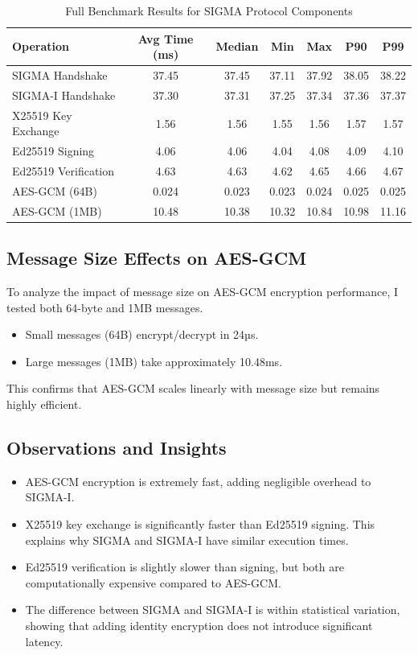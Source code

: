 \documentclass[twoside,a4paper,12pt]{article}
\begin{document}
\begin{table}[h]
    \centering
    \caption{Full Benchmark Results for SIGMA Protocol Components}
    \label{tab:full_benchmark_results}
    \renewcommand{\arraystretch}{1.2} %
    \begin{tabular}{|l|c|c|c|c|c|c|}
        \hline
        \textbf{Operation} & \textbf{Avg Time (ms)} & \textbf{Median} & \textbf{Min} & \textbf{Max} & \textbf{P90} & \textbf{P99} \\
        \hline
        SIGMA Handshake & 37.45 & 37.45 & 37.11 & 37.92 & 38.05 & 38.22 \\
        SIGMA-I Handshake & 37.30 & 37.31 & 37.25 & 37.34 & 37.36 & 37.37 \\
        X25519 Key Exchange & 1.56 & 1.56 & 1.55 & 1.56 & 1.57 & 1.57 \\
        Ed25519 Signing & 4.06 & 4.06 & 4.04 & 4.08 & 4.09 & 4.10 \\
        Ed25519 Verification & 4.63 & 4.63 & 4.62 & 4.65 & 4.66 & 4.67 \\
        AES-GCM (64B) & 0.024 & 0.023 & 0.023 & 0.024 & 0.025 & 0.025 \\
        AES-GCM (1MB) & 10.48 & 10.38 & 10.32 & 10.84 & 10.98 & 11.16 \\
        \hline
    \end{tabular}
\end{table}
\subsection{Message Size Effects on AES-GCM}
To analyze the impact of message size on AES-GCM encryption performance, I tested both 64-byte and 1MB messages. 

\begin{itemize}
    \item Small messages (64B) encrypt/decrypt in 24µs.
    \item Large messages (1MB) take approximately 10.48ms.
\end{itemize}

This confirms that AES-GCM scales linearly with message size but remains highly efficient.

\subsection{Observations and Insights}
\begin{itemize}
    \item AES-GCM encryption is extremely fast, adding negligible overhead to SIGMA-I.
    \item X25519 key exchange is significantly faster than Ed25519 signing. This explains why SIGMA and SIGMA-I have similar execution times.
    \item Ed25519 verification is slightly slower than signing, but both are computationally expensive compared to AES-GCM.
    \item The difference between SIGMA and SIGMA-I is within statistical variation, showing that adding identity encryption does not introduce significant latency.
\end{itemize}
\end{document}

